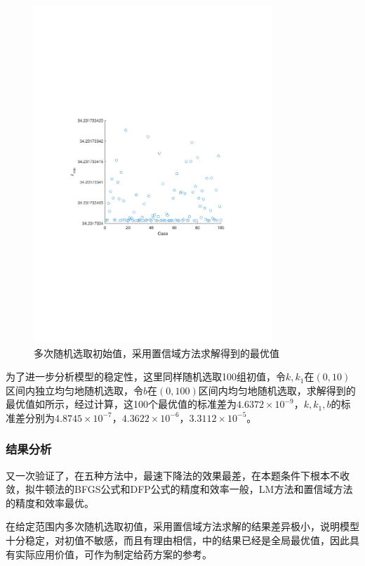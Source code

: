 \documentclass[12pt,a4paper]{article}
\begin{document}
\begin{figure}[t]
    \centering
    \includegraphics[width=0.8\textwidth,trim={3.09cm 9.295cm 3.09cm 9.295cm},clip]{fig/ex8_init.pdf}
    \caption{多次随机选取初始值，采用置信域方法求解得到的最优值}
    \label{fig:ex8_init}
\end{figure}

为了进一步分析模型的稳定性，这里同样随机选取100组初值，令$k,k_1$在$(0, 10)$区间内独立均匀地随机选取，令$b$在$(0,100)$区间内均匀地随机选取，求解得到的最优值如所示，经过计算，这100个最优值的标准差为$4.6372\times 10^{-9}$，$k,k_1,b$的标准差分别为$4.8745\times 10^{-7}$，$4.3622\times 10^{-6}$，$3.3112\times 10^{-5}$。

\subsubsection{结果分析}

又一次验证了，在五种方法中，最速下降法的效果最差，在本题条件下根本不收敛，拟牛顿法的BFGS公式和DFP公式的精度和效率一般，LM方法和置信域方法的精度和效率最优。

在给定范围内多次随机选取初值，采用置信域方法求解的结果差异极小，说明模型十分稳定，对初值不敏感，而且有理由相信，中的结果已经是全局最优值，因此具有实际应用价值，可作为制定给药方案的参考。
\end{document}
